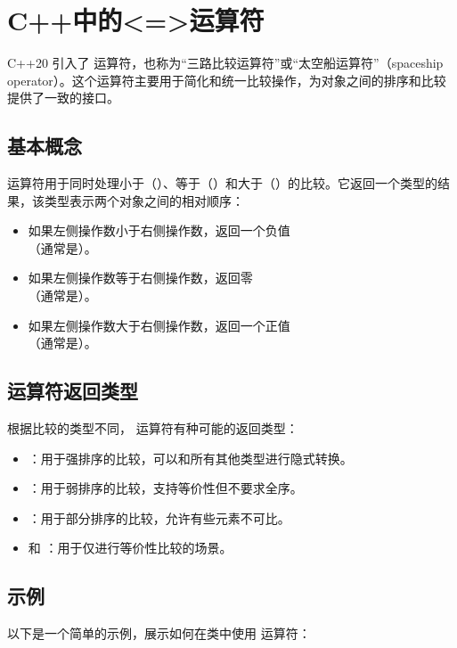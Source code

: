\chapter{C++中的<=>运算符}

C++20 引入了 \cppinline{<=>} 运算符，也称为“三路比较运算符”或“太空船运算符”（spaceship operator）。这个运算符主要用于简化和统一比较操作，为对象之间的排序和比较提供了一致的接口。

\section{基本概念}
\cppinline{<=>} 运算符用于同时处理小于（\cppinline{<}）、等于（\cppinline{==}）和大于（\cppinline{>}）的比较。它返回一个类型的结果，该类型表示两个对象之间的相对顺序：

\begin{itemize}
	\item 如果左侧操作数小于右侧操作数，返回一个负值\\（通常是）。
	\item 如果左侧操作数等于右侧操作数，返回零\\（通常是）。
	\item 如果左侧操作数大于右侧操作数，返回一个正值\\（通常是）。
\end{itemize}

\section{运算符返回类型}
根据比较的类型不同，\cppinline{<=>} 运算符有种可能的返回类型：

\begin{itemize}
	\item {}：用于强排序的比较，可以和所有其他类型进行隐式转换。
	\item {}：用于弱排序的比较，支持等价性但不要求全序。
	\item {}：用于部分排序的比较，允许有些元素不可比。
	\item {} 和 ：用于仅进行等价性比较的场景。
\end{itemize}

\section{示例}
以下是一个简单的示例，展示如何在类中使用 \cppinline{<=>} 运算符：

